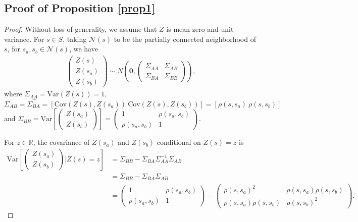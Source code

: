 \documentclass{article}
\newcommand{\Var}{\mathrm{Var}}
\newcommand{\Cov}{\mathrm{Cov}}
\begin{document}
\subsection{Proof of Proposition \ref{prop1}\label{appendix.a1}}
\begin{proof}
Without loss of generality, we assume that $Z$ is mean zero and unit variance. For $s \in S$, taking $\mathcal{N}(s)$ to be the partially connected neighborhood of $s$, for $s_a, s_b \in \mathcal{N}(s)$, we have
\begin{align*}
    \begin{pmatrix} Z(s) \\ Z(s_a) \\ Z(s_b) \end{pmatrix} \sim N\left(\mathbf{0}, \begin{pmatrix} \Sigma_{AA} & \Sigma_{AB} \\ \Sigma_{BA} & \Sigma_{BB} \end{pmatrix}\right),
\end{align*}
where $\Sigma_{AA} = \Var(Z(s)) = 1$, $\Sigma_{AB} = \Sigma_{BA}^\top = \left[\Cov(Z(s), Z(s_a))\  \Cov(Z(s), Z(s_b))\right] = \left[\rho(s,s_a)\ \rho(s, s_b)\right]$ and $\Sigma_{BB} = \Var\left[\begin{pmatrix} Z(s_a) \\ Z(s_b) \end{pmatrix}\right] = \begin{pmatrix}
    1 & \rho(s_a, s_b) \\ \rho(s_a, s_b) & 1
    \end{pmatrix} $.

For $z \in \mathbb{R}$, the covariance of $Z(s_a)$ and $Z(s_b)$ conditional on $Z(s)=z$ is 
\begin{align*}
    \Var\left[\begin{pmatrix} Z(s_a) \\ Z(s_b) \end{pmatrix}\Bigg|Z(s) = z\right] &= \Sigma_{BB} - \Sigma_{BA}\Sigma_{AA}^{-1}\Sigma_{AB}\\ &= \Sigma_{BB} - \Sigma_{BA}\Sigma_{AB} \\ &= \begin{pmatrix}
    1 & \rho(s_a, s_b) \\ \rho(s_a, s_b) & 1
    \end{pmatrix} - \begin{pmatrix}
    \rho(s, s_a)^2 & \rho(s, s_a)\rho(s, s_b) \\ \rho(s, s_a)\rho(s, s_b) & \rho(s, s_b)^2
    \end{pmatrix}.
\end{align*}


\end{proof}
\end{document}
